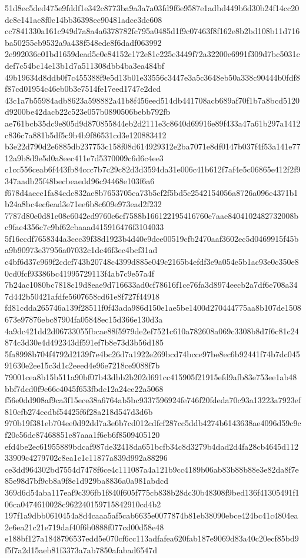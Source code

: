 \documentclass[11pt,a4paper]{article}
\begin{document}
{51d8ec5ded475e9fddf1e342c8773ba9a3a7a03fd9f6e9587e1adbd449b6d30b24f14cc20dc8e141ac8f0c14bb36398ec90481adce3dc608
cc7841330a161c949d7a8a4a6378782fc795a0485d1f9c07463f8f162e8b2bd108b11d716ba50255cb9532a9a438f548ede8f6dadf063992
2e992036c01bd1659dead5c0e84152c172e81c225e3449f72a32200e6991f309d7bc5031cdef7c54bc14e13b1d7a511308dbb4ba3ea484bf
49b19634d8ddb0f7c455388f9e5d13b01e33556c3447e3a5c3648eb50a338c90444b0fdf8f87cd01954c46eb0b3e7514fe17eed1747e2dcd
43c1a7b55984adb8623a598882a41b8f456eed514db441708acb689af70f1b7a8bcd5120d9200be42dacb22c523e057b0890506bebb792fb
ae761bcb35dc9e805d9d870855844eb2d2111e3c8640d69916e89f433a47a61b297a1412c836c7a881b5df5c9b4b9f86531cd3e120883412
b3e22d790d2e6885db237753c158f08d614929312e2ba7071e8df0147b037f4f53a141e7712a9b8d9e5d0a8eec411e7d5370009c6d6c4ee3
c1cc556ceab6f443fb84ccc7b7c29c82d3d3594da31e006c41b612f7af4e5c06865e412f2f9347aadb25f48becbeaedd96c94468e103f6a6
f678d4aecc1fa84cdc832ae8b7653705ea73b5cf2f5bd5c2542154056a8726a096e4371b1b24a8bc4ec6ead3e71ee6b8c609e973ead2f232
7787d80e0d81e08e6042ed9760e6cf7588b166122195416760e7aae8404102482732008bc9fae4356c7c9bf62cbaaad415916476f3104033
5f16ccdf7658344a3cec39f38d1923b4d40e9dee00519cfb2470aaf3602ec5d0469915f45ba9b90973e37956a07032c1dc46f3ec4bcf31ad
c4bf6d37c969f2cdcf743b20748c4399d885e049c2165b4efdf3e9a054e5b1ac93e0c350e80cd0fcf93386bc41995729113f4ab7c9e57a4f
7b24ac1080bc7818c19d8eae9d716633ad0cf78616f1ce76fa3d8974eecb2a7df6e708a347d442b50421afdfe5607658cd61e8f727f44918
fd81cdda265746a139f28511f0f43ada986d150e1ae5be1400d270444775aa8b107de1508673e97876ebc87904fa05848ec15d366e130d3a
4a9dc421dd2d06733055fbcae88f5979de2ef7521c610a782608a069c3308b8d7f6c81c24874c3d30e4d492343df591ef7b8e73d3b56d185
5fa8998b704f4792d2139f7e4bc26d7a1922e269bcd74bcce97be8ec6b92441f74b7dc04591630e2ee15c3d1c2eeed4e96e7218ce9088f7b
79001cea8b15b511a90bf07b43dbb2b202d691cc415905f21915efd9afb83e753ee1ab48bbf7dcd0f9e66e4045f653fbdc12a24ce22a5068
f56e0dd908af9ca3f15ece38a6764ab5bc9337596924fe746f20fdeda70c93a13223a7923ef810cfb274ecdbf54425f6f28a218d547d3d6b
970b19f381eb704ee0d92dd7a3e6b7cd012cdfcf287cc5ddb4274b6143638ae4096d59c9cf20c56de87468851e87aaa1f6eb6f8509405120
efd4be2ec61955889bdcaf987de32418da651bcfb34c8d3279b4dad2d4fa28cb4645d11233909c4279702c8ea1c1c11877a839d992a88296
ce3dd964302bd7554d7478f6ce4c111087a4a121b9cc4189b06ab83b88b88e3e82da8f7e85e98d7bf9cb8a9f8e1d929ba8836a0a981abdcd
369d6d54aba117eaf9c396fb1f840f605f775cb838b28dc30b48308f9bed136f41305491f106ca0474610028c962240159715842910cd4b2
197f1a9dbb0610454a8d4caaa5af5cab6635e0077874b81eb38090ebce424bc41c4804ea2e6ea21c21e719daf40f6b0888f077cd00d58e48
e188bf127a1848796537edd5e070cf6cc113adfafea620fab187e9069d83a40c20ecf85bd9f5f7a2d15aeb81f3373a7ab7850afabad6547d
}
\end{document}
